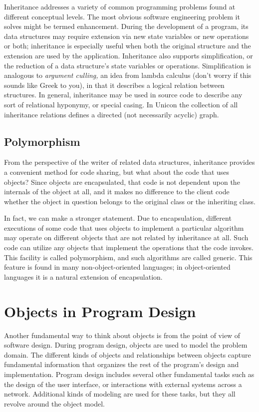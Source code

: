 Inheritance addresses a variety of common programming problems found at
different conceptual levels. The most obvious software engineering
problem it solves might be termed enhancement. During the development
of a program, its data structures may require extension via new state
variables or new operations or both; inheritance is especially useful
when both the original structure and the extension are used by the
application. Inheritance also supports simplification, or the reduction
of a data structure's state variables or operations.
Simplification is analogous to \textit{argument
culling}\textit{,} an idea from lambda calculus (don't
worry if this sounds like Greek to you), in that it describes a logical
relation between structures. In general, inheritance may be used in
source code to describe any sort of relational hyponymy, or special
casing. In Unicon the collection of all inheritance relations defines a
directed (not necessarily acyclic) graph. 

\subsection{Polymorphism}

From the perspective of the writer of related data
structures, inheritance provides a convenient method for code sharing,
but what about the code that uses objects? Since objects are
encapsulated, that code is not dependent upon the internals of the
object at all, and it makes no difference to the client code whether
the object in question belongs to the original class or the inheriting
class. 

In fact, we can make a stronger statement. Due to encapsulation,
different executions of some code that uses objects to implement a
particular algorithm may operate on different objects that are not
related by inheritance at all. Such code can utilize any objects that
implement the operations that the code invokes. This facility is called
polymorphism, and such algorithms are called generic. This feature is
found in many non-object-oriented languages; in object-oriented
languages it is a natural extension of encapsulation. 

\section{Objects in Program Design}

Another fundamental way to think about objects is
from the point of view of software design. During program design,
objects are used to model the problem domain. The different kinds of
objects and relationships between objects capture fundamental
information that organizes the rest of the program's
design and implementation. Program design includes several other
fundamental tasks such as the design of the user interface, or
interactions with external systems across a network. Additional kinds
of modeling are used for these tasks, but they all revolve around the
object model.

